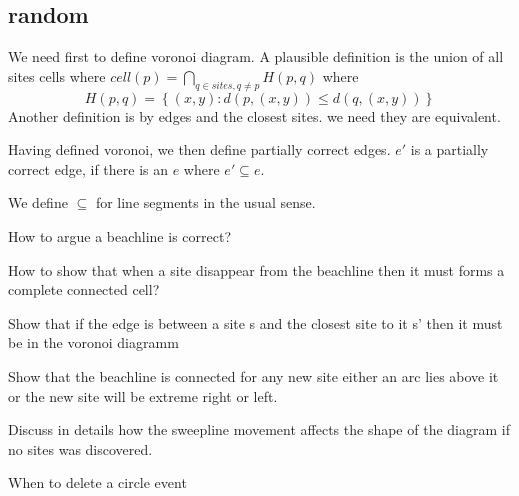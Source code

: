 \documentclass{article}
\begin{document}
\subsection{random}
We need first to define voronoi diagram. A plausible definition is the union of all sites cells where $cell(p)= \bigcap_{q \in sites, q\not = p} H(p, q) $ where 
$$H(p, q) = \left\{(x,y) : d\left(p,(x, y) \right) \leq  d\left(q,(x, y) \right) \right\}$$ 
Another definition is by edges and the closest sites. we need they are equivalent.

Having defined voronoi, we then define partially correct edges. $e'$ is a partially correct edge, if there is an $e$ where $e' \subseteq e$.

We define $\subseteq$ for line segments in the usual sense. 

How to argue a beachline is correct?

How to show that when a site disappear from the beachline then it must forms a complete connected cell?

Show that if the edge is between a site s and the closest site to it s' then it must be in the voronoi diagramm

Show that the beachline is connected for any new site either an arc lies above it or the new site will be extreme right or left.

Discuss in details how the sweepline movement affects the shape of the diagram if no sites was discovered.

When to delete a circle event
\end{document}

